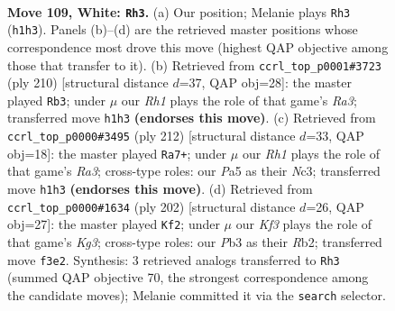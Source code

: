 \documentclass[11pt]{article}
\begin{document}
\clearpage

\begin{figure}[p]\centering
\begin{subfigure}{0.46\textwidth}\centering
\resizebox{\linewidth}{!}{%
\newchessgame
\chessboard[
  setfen={8/1k6/p5r1/P1p2p1p/1p3P1P/1P2PKP1/8/7R w - - 5 109},
  showmover=false,
  pgfstyle=straightmove, color=movearrow, markmove={h1-h3}
]}
\caption{}
\end{subfigure}\hfill
\begin{subfigure}{0.46\textwidth}\centering
\resizebox{\linewidth}{!}{%
\newchessgame
\chessboard[
  setfen={8/5pk1/4p3/4Pp1p/5P1P/R5PK/4r3/8 w - - 95 106},
  showmover=false,
  pgfstyle=straightmove, color=movearrow, markmove={a3-b3}
]}
\caption{}
\end{subfigure}
\\[4pt]
\begin{subfigure}{0.46\textwidth}\centering
\resizebox{\linewidth}{!}{%
\newchessgame
\chessboard[
  setfen={8/4k3/3pp3/2p1p1bp/2P1P3/R1NP1KP1/1r3P2/8 w - - 8 107},
  showmover=false,
  pgfstyle=straightmove, color=movearrow, markmove={a3-a7}
]}
\caption{}
\end{subfigure}\hfill
\begin{subfigure}{0.46\textwidth}\centering
\resizebox{\linewidth}{!}{%
\newchessgame
\chessboard[
  setfen={8/2p5/3p2pk/r2Pp1p1/2P1P3/5PKP/1R6/8 w - - 21 102},
  showmover=false,
  pgfstyle=straightmove, color=movearrow, markmove={g3-f2}
]}
\caption{}
\end{subfigure}
\caption{\textbf{Move 109, White: \texttt{Rh3}.} (a) Our position; Melanie plays \texttt{Rh3} (\texttt{h1h3}). Panels (b)--(d) are the retrieved master positions whose correspondence most drove this move (highest QAP objective among those that transfer to it). (b) Retrieved from \texttt{ccrl\_top\_p0001\#3723} (ply 210) [structural distance $d$=37, QAP obj=28]: the master played \texttt{Rb3}; under $\mu$ our \emph{Rh1} plays the role of that game's \emph{Ra3}; transferred move \texttt{h1h3} \textbf{(endorses this move)}. (c) Retrieved from \texttt{ccrl\_top\_p0000\#3495} (ply 212) [structural distance $d$=33, QAP obj=18]: the master played \texttt{Ra7+}; under $\mu$ our \emph{Rh1} plays the role of that game's \emph{Ra3}; cross-type roles: our \emph{P}a5 as their \emph{N}c3; transferred move \texttt{h1h3} \textbf{(endorses this move)}. (d) Retrieved from \texttt{ccrl\_top\_p0000\#1634} (ply 202) [structural distance $d$=26, QAP obj=27]: the master played \texttt{Kf2}; under $\mu$ our \emph{Kf3} plays the role of that game's \emph{Kg3}; cross-type roles: our \emph{P}b3 as their \emph{R}b2; transferred move \texttt{f3e2}. Synthesis: 3 retrieved analogs transferred to \texttt{Rh3} (summed QAP objective 70, the strongest correspondence among the candidate moves); Melanie committed it via the \texttt{search} selector.}
\label{fig:thought-m216}
\end{figure}
\end{document}
